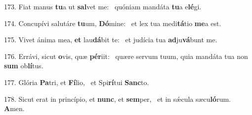 173. Fiat manus \textbf{tu}a ut \textbf{sal}vet me: \ast\  quóniam mandáta \textbf{tu}a e\textbf{lé}gi.\

174. Concupívi salutáre \textbf{tu}um, \textbf{Dó}mine: \ast\  et lex tua medi\textbf{tá}tio \textbf{me}a est.\

175. Vivet ánima mea, \textbf{et} lau\textbf{dá}bit te: \ast\  et judícia tua \textbf{ad}ju\textbf{vá}bunt me.\

176. Errávi, sicut \textbf{o}vis, quæ \textbf{pér}iit: \ast\  quære servum tuum, quia mandáta tua non \textbf{sum} ob\textbf{lí}tus.\

177. Glória \textbf{Pa}tri, et \textbf{Fí}lio, \ast\  et Spi\textbf{rí}tui \textbf{Sanc}to.\

178. Sicut erat in princípio, et \textbf{nunc}, et \textbf{sem}per, \ast\  et in sǽcula sæcu\textbf{ló}rum. \textbf{A}men.\

